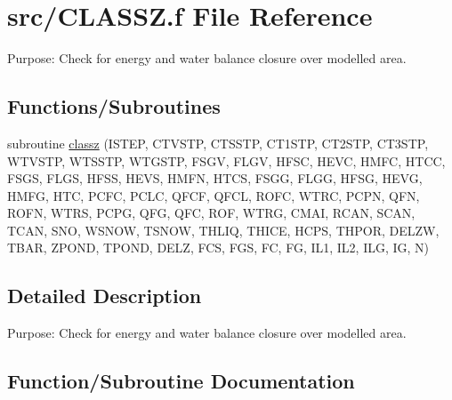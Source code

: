 \hypertarget{CLASSZ_8f}{}\section{src/\+C\+L\+A\+S\+S\+Z.f File Reference}
\label{CLASSZ_8f}


Purpose\+: Check for energy and water balance closure over modelled area.  


\subsection*{Functions/\+Subroutines}
\begin{DoxyCompactItemize}
\item 
subroutine \hyperlink{CLASSZ_8f_a3011accdb26e214045175dff31aead39}{classz} (I\+S\+T\+E\+P, C\+T\+V\+S\+T\+P, C\+T\+S\+S\+T\+P, C\+T1\+S\+T\+P, C\+T2\+S\+T\+P, C\+T3\+S\+T\+P, W\+T\+V\+S\+T\+P, W\+T\+S\+S\+T\+P, W\+T\+G\+S\+T\+P, F\+S\+G\+V, F\+L\+G\+V, H\+F\+S\+C, H\+E\+V\+C, H\+M\+F\+C, H\+T\+C\+C, F\+S\+G\+S, F\+L\+G\+S, H\+F\+S\+S, H\+E\+V\+S, H\+M\+F\+N, H\+T\+C\+S, F\+S\+G\+G, F\+L\+G\+G, H\+F\+S\+G, H\+E\+V\+G, H\+M\+F\+G, H\+T\+C, P\+C\+F\+C, P\+C\+L\+C, Q\+F\+C\+F, Q\+F\+C\+L, R\+O\+F\+C, W\+T\+R\+C, P\+C\+P\+N, Q\+F\+N, R\+O\+F\+N, W\+T\+R\+S, P\+C\+P\+G, Q\+F\+G, Q\+F\+C, R\+O\+F, W\+T\+R\+G, C\+M\+A\+I, R\+C\+A\+N, S\+C\+A\+N, T\+C\+A\+N, S\+N\+O, W\+S\+N\+O\+W, T\+S\+N\+O\+W, T\+H\+L\+I\+Q, T\+H\+I\+C\+E, H\+C\+P\+S, T\+H\+P\+O\+R, D\+E\+L\+Z\+W, T\+B\+A\+R, Z\+P\+O\+N\+D, T\+P\+O\+N\+D, D\+E\+L\+Z, F\+C\+S, F\+G\+S, F\+C, F\+G, I\+L1, I\+L2, I\+L\+G, I\+G, N)
\end{DoxyCompactItemize}


\subsection{Detailed Description}
Purpose\+: Check for energy and water balance closure over modelled area. 



\subsection{Function/\+Subroutine Documentation}
\hypertarget{CLASSZ_8f_a3011accdb26e214045175dff31aead39}{}
